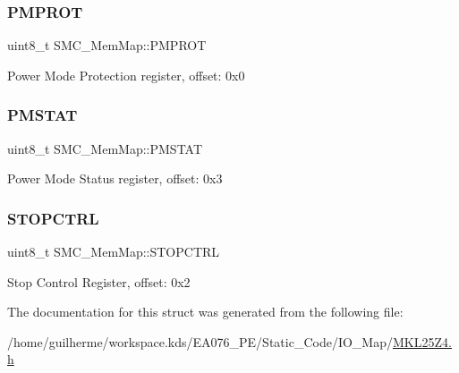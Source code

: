 \subsubsection{\texorpdfstring{P\+M\+P\+R\+OT}{PMPROT}}
{\footnotesize\ttfamily uint8\+\_\+t S\+M\+C\+\_\+\+Mem\+Map\+::\+P\+M\+P\+R\+OT}

Power Mode Protection register, offset\+: 0x0 \mbox{\label{struct_s_m_c___mem_map_a0fddef87e229c4cf1b3be0d29589e964}} 
\subsubsection{\texorpdfstring{P\+M\+S\+T\+AT}{PMSTAT}}
{\footnotesize\ttfamily uint8\+\_\+t S\+M\+C\+\_\+\+Mem\+Map\+::\+P\+M\+S\+T\+AT}

Power Mode Status register, offset\+: 0x3 \mbox{\label{struct_s_m_c___mem_map_a3065a98baea0fc4c0099b9782554a662}} 
\subsubsection{\texorpdfstring{S\+T\+O\+P\+C\+T\+RL}{STOPCTRL}}
{\footnotesize\ttfamily uint8\+\_\+t S\+M\+C\+\_\+\+Mem\+Map\+::\+S\+T\+O\+P\+C\+T\+RL}

Stop Control Register, offset\+: 0x2 

The documentation for this struct was generated from the following file\+:\begin{DoxyCompactItemize}
\item 
/home/guilherme/workspace.\+kds/\+E\+A076\+\_\+\+P\+E/\+Static\+\_\+\+Code/\+I\+O\+\_\+\+Map/\hyperlink{_m_k_l25_z4_8h}{M\+K\+L25\+Z4.\+h}\end{DoxyCompactItemize}
